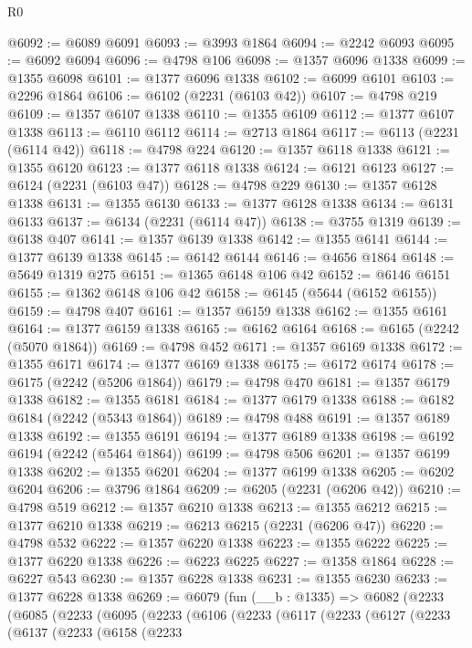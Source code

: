 \begin{lexlean}{R0}
\begin{coremodule}
@6092 := @6089 @6091
@6093 := @3993 @1864
@6094 := @2242 @6093
@6095 := @6092 @6094
@6096 := @4798 @106
@6098 := @1357 @6096 @1338
@6099 := @1355 @6098
@6101 := @1377 @6096 @1338
@6102 := @6099 @6101
@6103 := @2296 @1864
@6106 := @6102 (@2231 (@6103 @42))
@6107 := @4798 @219
@6109 := @1357 @6107 @1338
@6110 := @1355 @6109
@6112 := @1377 @6107 @1338
@6113 := @6110 @6112
@6114 := @2713 @1864
@6117 := @6113 (@2231 (@6114 @42))
@6118 := @4798 @224
@6120 := @1357 @6118 @1338
@6121 := @1355 @6120
@6123 := @1377 @6118 @1338
@6124 := @6121 @6123
@6127 := @6124 (@2231 (@6103 @47))
@6128 := @4798 @229
@6130 := @1357 @6128 @1338
@6131 := @1355 @6130
@6133 := @1377 @6128 @1338
@6134 := @6131 @6133
@6137 := @6134 (@2231 (@6114 @47))
@6138 := @3755 @1319
@6139 := @6138 @407
@6141 := @1357 @6139 @1338
@6142 := @1355 @6141
@6144 := @1377 @6139 @1338
@6145 := @6142 @6144
@6146 := @4656 @1864
@6148 := @5649 @1319 @275
@6151 := @1365 @6148 @106 @42
@6152 := @6146 @6151
@6155 := @1362 @6148 @106 @42
@6158 := @6145 (@5644 (@6152 @6155))
@6159 := @4798 @407
@6161 := @1357 @6159 @1338
@6162 := @1355 @6161
@6164 := @1377 @6159 @1338
@6165 := @6162 @6164
@6168 := @6165 (@2242 (@5070 @1864))
@6169 := @4798 @452
@6171 := @1357 @6169 @1338
@6172 := @1355 @6171
@6174 := @1377 @6169 @1338
@6175 := @6172 @6174
@6178 := @6175 (@2242 (@5206 @1864))
@6179 := @4798 @470
@6181 := @1357 @6179 @1338
@6182 := @1355 @6181
@6184 := @1377 @6179 @1338
@6188 := @6182 @6184 (@2242 (@5343 @1864))
@6189 := @4798 @488
@6191 := @1357 @6189 @1338
@6192 := @1355 @6191
@6194 := @1377 @6189 @1338
@6198 := @6192 @6194 (@2242 (@5464 @1864))
@6199 := @4798 @506
@6201 := @1357 @6199 @1338
@6202 := @1355 @6201
@6204 := @1377 @6199 @1338
@6205 := @6202 @6204
@6206 := @3796 @1864
@6209 := @6205 (@2231 (@6206 @42))
@6210 := @4798 @519
@6212 := @1357 @6210 @1338
@6213 := @1355 @6212
@6215 := @1377 @6210 @1338
@6219 := @6213 @6215 (@2231 (@6206 @47))
@6220 := @4798 @532
@6222 := @1357 @6220 @1338
@6223 := @1355 @6222
@6225 := @1377 @6220 @1338
@6226 := @6223 @6225
@6227 := @1358 @1864
@6228 := @6227 @543
@6230 := @1357 @6228 @1338
@6231 := @1355 @6230
@6233 := @1377 @6228 @1338
@6269 := @6079
    (fun (__b : @1335) =>
    @6082
      (@2233
        (@6085
          (@2233
            (@6095
              (@2233
                (@6106
                  (@2233
                    (@6117
                      (@2233
                        (@6127
                          (@2233
                            (@6137
                              (@2233
                                (@6158
                                  (@2233

\end{coremodule}
\end{lexlean}
